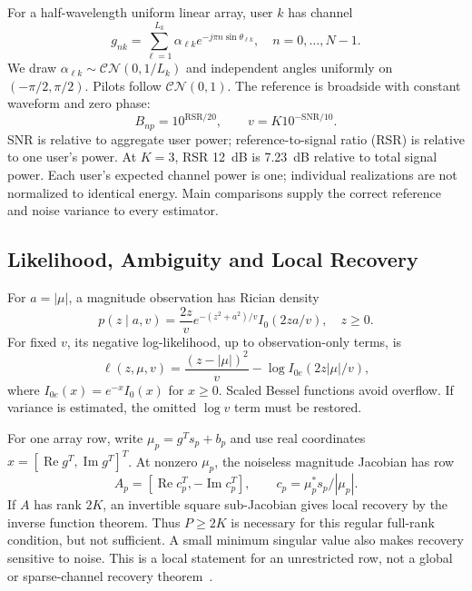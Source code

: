 \documentclass[10pt,journal,letterpaper]{IEEEtran}
\newcommand{\CN}{\mathcal{CN}}
\begin{document}
For a half-wavelength uniform linear array, user $k$ has channel
\begin{equation}
 g_{nk}=\sum_{\ell=1}^{L_k}\alpha_{\ell k}e^{-j\pi n\sin\theta_{\ell k}},
 \quad n=0,\ldots,N-1.
 \label{eq:channel}
\end{equation}
We draw $\alpha_{\ell k}\sim\CN(0,1/L_k)$ and independent angles uniformly on $(-\pi/2,\pi/2)$. Pilots follow $\CN(0,1)$. The reference is broadside with constant waveform and zero phase:
\begin{equation}
 B_{np}=10^{\mathrm{RSR}/20},\qquad v=K10^{-\mathrm{SNR}/10}.
\end{equation}
SNR is relative to aggregate user power; reference-to-signal ratio (RSR) is relative to one user's power. At $K=3$, RSR 12~dB is 7.23~dB relative to total signal power. Each user's expected channel power is one; individual realizations are not normalized to identical energy. Main comparisons supply the correct reference and noise variance to every estimator.

\subsection{Likelihood, Ambiguity and Local Recovery}
For $a=|\mu|$, a magnitude observation has Rician density
\begin{equation}
 p(z\mid a,v)=\frac{2z}{v}e^{-(z^2+a^2)/v}I_0(2za/v),\quad z\ge0.
\end{equation}
For fixed $v$, its negative log-likelihood, up to observation-only terms, is
\begin{equation}
 \ell(z,\mu,v)=\frac{(z-|\mu|)^2}{v}-\log I_{0e}(2z|\mu|/v),
 \label{eq:loss}
\end{equation}
where $I_{0e}(x)=e^{-x}I_0(x)$ for $x\ge0$. Scaled Bessel functions avoid overflow. If variance is estimated, the omitted $\log v$ term must be restored.

For one array row, write $\mu_p=g^Ts_p+b_p$ and use real coordinates $x=[\operatorname{Re}g^T,\operatorname{Im}g^T]^T$. At nonzero $\mu_p$, the noiseless magnitude Jacobian has row
\begin{equation}
 A_p=[\operatorname{Re}c_p^T,-\operatorname{Im}c_p^T],\qquad
 c_p=\mu_p^*s_p/|\mu_p|.
 \label{eq:jacobian}
\end{equation}
If $A$ has rank $2K$, an invertible square sub-Jacobian gives local recovery by the inverse function theorem. Thus $P\ge2K$ is necessary for this regular full-rank condition, but not sufficient. A small minimum singular value also makes recovery sensitive to noise. This is a local statement for an unrestricted row, not a global or sparse-channel recovery theorem~\cite{gao2018}.
\end{document}
